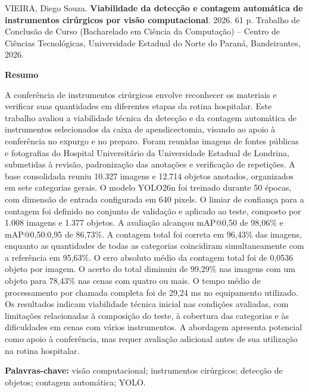 \thispagestyle{empty}
\normalfont\normalsize
\onehalfspacing
\raggedright\noindent VIEIRA, Diego Souza. \textbf{Viabilidade da detecção e contagem automática de instrumentos cirúrgicos por visão computacional}. 2026. 61 p. Trabalho de Conclusão de Curso (Bacharelado em Ciência da Computação) – Centro de Ciências Tecnológicas, Universidade Estadual do Norte do Paraná, Bandeirantes, 2026.
\vspace{24pt}

\centering \textbf{Resumo}
\vspace{24pt}

\raggedright A conferência de instrumentos cirúrgicos envolve reconhecer os materiais e verificar suas quantidades em diferentes etapas da rotina hospitalar. Este trabalho avaliou a viabilidade técnica da detecção e da contagem automática de instrumentos selecionados da caixa de apendicectomia, visando ao apoio à conferência no expurgo e no preparo. Foram reunidas imagens de fontes públicas e fotografias do Hospital Universitário da Universidade Estadual de Londrina, submetidas à revisão, padronização das anotações e verificação de repetições. A base consolidada reuniu 10.327 imagens e 12.714 objetos anotados, organizados em sete categorias gerais. O modelo YOLO26n foi treinado durante 50 épocas, com dimensão de entrada configurada em 640 pixels. O limiar de confiança para a contagem foi definido no conjunto de validação e aplicado ao teste, composto por 1.008 imagens e 1.377 objetos. A avaliação alcançou mAP@0,50 de 98,06\% e mAP@0,50:0,95 de 86,73\%. A contagem total foi correta em 96,43\% das imagens, enquanto as quantidades de todas as categorias coincidiram simultaneamente com a referência em 95,63\%. O erro absoluto médio da contagem total foi de 0,0536 objeto por imagem. O acerto do total diminuiu de 99,29\% nas imagens com um objeto para 78,43\% nas cenas com quatro ou mais. O tempo médio de processamento por chamada completa foi de 29,24 ms no equipamento utilizado. Os resultados indicam viabilidade técnica inicial nas condições avaliadas, com limitações relacionadas à composição do teste, à cobertura das categorias e às dificuldades em cenas com vários instrumentos. A abordagem apresenta potencial como apoio à conferência, mas requer avaliação adicional antes de sua utilização na rotina hospitalar.

\vspace{8pt}

\noindent\textbf{Palavras-chave:} visão computacional; instrumentos cirúrgicos; detecção de objetos; contagem automática; YOLO.
